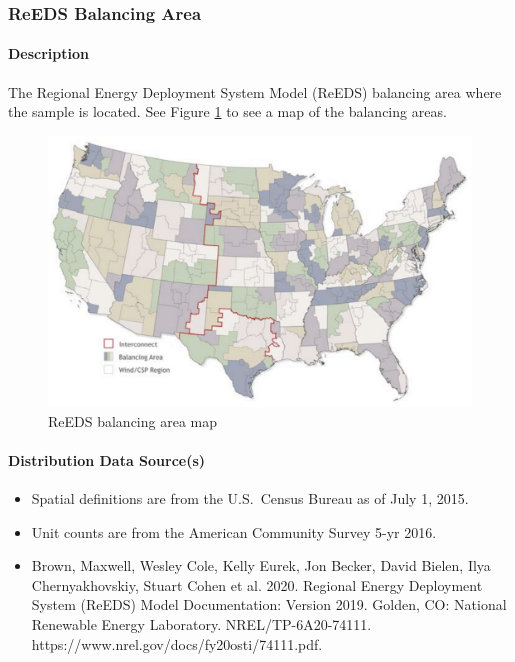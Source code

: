\subsubsection{ReEDS Balancing Area}
\paragraph{Description}
The Regional Energy Deployment System Model (ReEDS) balancing area where the sample is located. See Figure \ref{fig:reeds_ba_map} to see a map of the balancing areas.

\begin{figure}
    \centering
    \includegraphics[width=1\linewidth]{images/reeds_ba_map.png}
    \caption{ReEDS balancing area map}
    \label{fig:reeds_ba_map}
\end{figure}

\paragraph{Distribution Data Source(s)}
\begin{itemize}
    \item Spatial definitions are from the U.S.~Census Bureau as of July 1, 2015.
    \item Unit counts are from the American Community Survey 5-yr 2016.
    \item Brown, Maxwell, Wesley Cole, Kelly Eurek, Jon Becker, David Bielen, Ilya Chernyakhovskiy, Stuart Cohen et al. 2020. Regional Energy Deployment System (ReEDS) Model Documentation: Version 2019. Golden, CO: National Renewable Energy Laboratory. NREL/TP-6A20-74111. https://www.nrel.gov/docs/fy20osti/74111.pdf.
\end{itemize}

